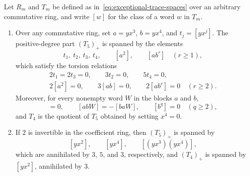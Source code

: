 \begin{lemma}
\label{lem:e78-traces}
Let $R_m$ and $T_m$ be defined as in~\eqref{eq:exceptional-trace-spaces} over an arbitrary commutative ring, and write $[w]$ for the class of a word $w$ in $T_m$.
\begin{enumerate}[label={\upshape(\arabic*)}]
\item Over any commutative ring, set $a=yx^3$, $b=yx^4$, and $t_j=[yx^j]$. The positive-degree part $(T_5)_+$ is spanned by the elements
\[
  t_1,\ t_2,\ t_3,\ t_4,\qquad [a^2],\qquad [ab^r]\quad(r\geq1),
\]
which satisfy the torsion relations
\begin{equation}
  \begin{gathered}
  2t_1=2t_3=0,\qquad 3t_2=0,\qquad 5t_4=0,\\
  2[a^2]=0,\qquad 3[ab]=0,\qquad 2[ab^r]=0\quad(r\geq2).
  \end{gathered}
  \label{eq:integral-exceptional-trace-relations}
\end{equation}
Moreover, for every nonempty word $W$ in the blocks $a$ and $b$,
\begin{equation}
  [a^2W]=0,\qquad [abW]=-[baW],\qquad [b^q]=0\quad(q\geq2),
  \label{eq:integral-exceptional-block-relations}
\end{equation}
and $T_4$ is the quotient of $T_5$ obtained by setting $x^4=0$.
\item If $2$ is invertible in the coefficient ring, then $(T_5)_+$ is spanned by
\[
  [yx^2],\qquad [yx^4],\qquad [(yx^3)(yx^4)],
\]
which are annihilated by $3$, $5$, and $3$, respectively, and $(T_4)_+$ is spanned by $[yx^2]$, annihilated by $3$.
\end{enumerate}
\end{lemma}
